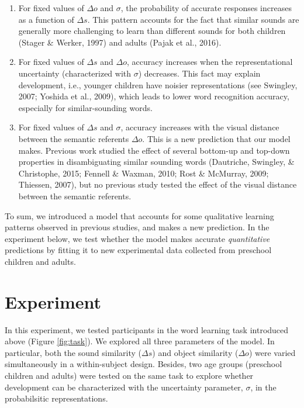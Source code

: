 \documentclass[10pt, letterpaper]{article}
\begin{document}
\begin{enumerate}
\def\labelenumi{\arabic{enumi})}
\item
  For fixed values of \(\Delta o\) and \(\sigma\), the probability of
  accurate responses increases as a function of \(\Delta s\). This
  pattern accounts for the fact that similar sounds are generally more
  challenging to learn than different sounds for both children (Stager
  \& Werker, 1997) and adults (Pajak et al., 2016).
\item
  For fixed values of \(\Delta s\) and \(\Delta o\), accuracy increases
  when the representational uncertainty (characterized with \(\sigma\))
  decreases. This fact may explain development, i.e., younger children
  have noisier representations (see Swingley, 2007; Yoshida et al.,
  2009), which leads to lower word recognition accuracy, especially for
  similar-sounding words.
\item
  For fixed values of \(\Delta s\) and \(\sigma\), accuracy increases
  with the visual distance between the semantic referents \(\Delta o\).
  This is a new prediction that our model makes. Previous work studied
  the effect of several bottom-up and top-down properties in
  disambiguating similar sounding words (Dautriche, Swingley, \&
  Christophe, 2015; Fennell \& Waxman, 2010; Rost \& McMurray, 2009;
  Thiessen, 2007), but no previous study tested the effect of the visual
  distance between the semantic referents.
\end{enumerate}

To sum, we introduced a model that accounts for some qualitative
learning patterns observed in previous studies, and makes a new
prediction. In the experiment below, we test whether the model makes
accurate \emph{quantitative} predictions by fitting it to new
experimental data collected from preschool children and adults.

\section{Experiment}\label{experiment}

In this experiment, we tested participants in the word learning task
introduced above (Figure \ref{fig:task}). We explored all three
parameters of the model. In particular, both the sound similarity
(\(\Delta s\)) and object similarity (\(\Delta o\)) were varied
simultaneously in a within-subject design. Besides, two age groups
(preschool children and adults) were tested on the same task to explore
whether development can be characterized with the uncertainty parameter,
\(\sigma\), in the probabilsitic representations.
\end{document}
